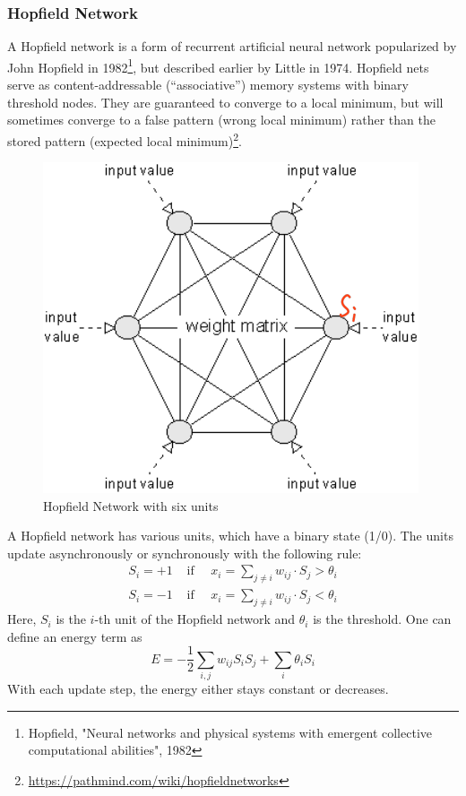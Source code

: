 \documentclass[main]{subfiles}
\begin{document}
\subsubsection{Hopfield Network}
A Hopfield network is a form of recurrent artificial neural network popularized by John Hopfield in 1982\footnote{Hopfield, "Neural networks and physical systems with emergent collective computational abilities", 1982}, but described earlier by Little in 1974. Hopfield nets serve as content-addressable (“associative”) memory systems with binary threshold nodes. They are guaranteed to converge to a local minimum, but will sometimes converge to a false pattern (wrong local minimum) rather than the stored pattern (expected local minimum)\footnote{\url{https://pathmind.com/wiki/hopfieldnetworks}}.
%
\begin{figure}[H]
    \centering
    \includegraphics[width=0.6\linewidth]{13_LearningInRecurrentNeuronalNetworks/figures/hopfield.png}
    \caption{Hopfield Network with six units}
    \label{fig:lstm_many}
\end{figure}
%
A Hopfield network has various units, which have a binary state (1/0). The units update asynchronously or synchronously with the following rule:
\[
\begin{array}{ll}
{S_{i}=+1} & {\text { if } \quad x_{i}=\sum_{j \neq i} w_{i j} \cdot S_{j}>\theta_i} \\
{S_{i}=-1} & {\text { if } \quad x_{i}=\sum_{j \neq i} w_{i j} \cdot S_{j}<\theta_i}
\end{array}
\]
Here, $S_i$ is the $i$-th unit of the Hopfield network and $\theta_i$ is the threshold. One can define an energy term as
\begin{equation}
E=-\frac{1}{2} \sum_{i, j} w_{i j} S_{i} S_{j}+\sum_{i} \theta_{i} S_{i}
\end{equation}
With each update step, the energy either stays constant or decreases. 
\end{document}
